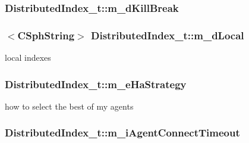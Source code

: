 \hypertarget{structDistributedIndex__t_adf15d98e55c4768150b3343c5e6c86da}{
\subsubsection[{m\-\_\-d\-Kill\-Break}]{ Distributed\-Index\-\_\-t\-::m\-\_\-d\-Kill\-Break}}\label{structDistributedIndex__t_adf15d98e55c4768150b3343c5e6c86da}
\hypertarget{structDistributedIndex__t_a77bfd2b43676a6daa3fe0e7d472005dd}{
\subsubsection[{m\-\_\-d\-Local}]{$<${\bf C\-Sph\-String}$>$ Distributed\-Index\-\_\-t\-::m\-\_\-d\-Local}}\label{structDistributedIndex__t_a77bfd2b43676a6daa3fe0e7d472005dd}


local indexes 

\hypertarget{structDistributedIndex__t_a5ddafdbdd4be27caf676e0c77e86bdc6}{
\subsubsection[{m\-\_\-e\-Ha\-Strategy}]{ Distributed\-Index\-\_\-t\-::m\-\_\-e\-Ha\-Strategy}}\label{structDistributedIndex__t_a5ddafdbdd4be27caf676e0c77e86bdc6}


how to select the best of my agents 

\hypertarget{structDistributedIndex__t_a15c36f5ea8f86fc4222b961537049409}{
\subsubsection[{m\-\_\-i\-Agent\-Connect\-Timeout}]{ Distributed\-Index\-\_\-t\-::m\-\_\-i\-Agent\-Connect\-Timeout}}\label{structDistributedIndex__t_a15c36f5ea8f86fc4222b961537049409}


